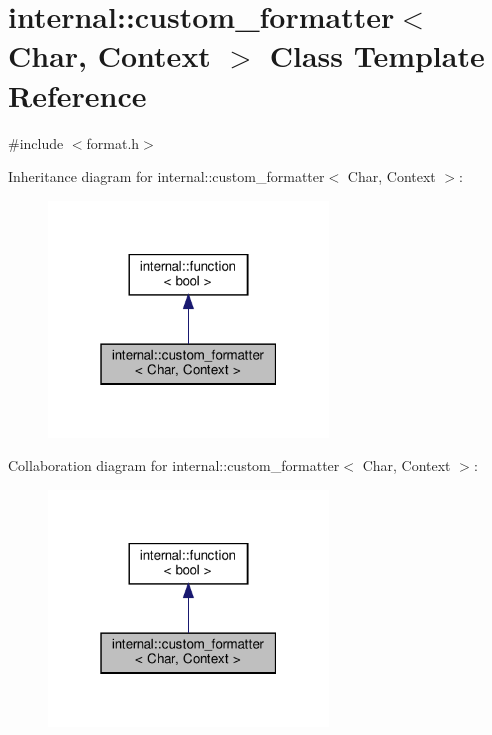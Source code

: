 \hypertarget{classinternal_1_1custom__formatter}{}\section{internal\+:\+:custom\+\_\+formatter$<$ Char, Context $>$ Class Template Reference}
\label{classinternal_1_1custom__formatter}


{\ttfamily \#include $<$format.\+h$>$}



Inheritance diagram for internal\+:\+:custom\+\_\+formatter$<$ Char, Context $>$\+:
\nopagebreak
\begin{figure}[H]
\begin{center}
\leavevmode
\includegraphics[width=211pt]{classinternal_1_1custom__formatter__inherit__graph}
\end{center}
\end{figure}


Collaboration diagram for internal\+:\+:custom\+\_\+formatter$<$ Char, Context $>$\+:
\nopagebreak
\begin{figure}[H]
\begin{center}
\leavevmode
\includegraphics[width=211pt]{classinternal_1_1custom__formatter__coll__graph}
\end{center}
\end{figure}
